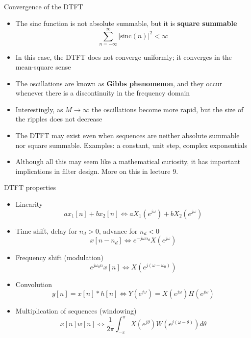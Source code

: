 \documentclass[10pt]{beamer}
\begin{document}
%
\begin{frame}{Convergence of the DTFT}
\begin{itemize}
	\item The sinc function is not absolute summable, but it is \textbf{square summable}
	\begin{equation*}
		\sum_{n=-\infty}^{\infty} |\mathrm{sinc}(n)|^2 < \infty
	\end{equation*}
	\item In this case, the DTFT does not converge uniformly; it converges in the mean-square sense
	\item The oscillations are known as \textbf{Gibbs phenomenon}, and they occur whenever there is a discontinuity in the frequency domain
	\item Interestingly, as $M\to\infty$ the oscillations become more rapid, but the size of the ripples does not decrease
	\item The DTFT may exist even when sequences are neither absolute summable nor square summable. Examples: a constant, unit step, complex exponentials
	\item Although all this may seem like a mathematical curiosity, it has important implications in filter design. More on this in lecture 9.
\end{itemize}
	
\end{frame}

%
\begin{frame}{DTFT properties}
\begin{itemize}
\item Linearity
	\begin{equation*}
	ax_1[n]  + bx_2[n] \Longleftrightarrow aX_1(e^{j\omega})+bX_2(e^{j\omega})
	\end{equation*}
\item Time shift, delay for $n_d > 0$, advance for $n_d < 0$
	\begin{equation*}
	x[n-n_d] \Longleftrightarrow e^{-j\omega n_d}X(e^{j\omega})
	\end{equation*}
\item Frequency shift (modulation)
	\begin{equation*}
	e^{j\omega_0n}x[n] \Longleftrightarrow X(e^{j(\omega-\omega_0)})
	\end{equation*}
\item Convolution
	\begin{equation*}
	y[n] = x[n]\ast h[n] \Longleftrightarrow Y(e^{j\omega}) = X(e^{j\omega})H(e^{j\omega})
	\end{equation*}
\item Multiplication of sequences (windowing)
	\begin{equation*}
	x[n]w[n] \Longleftrightarrow \frac{1}{2\pi}\int_{-\pi}^{\pi}X(e^{j\theta})W(e^{j(\omega-\theta)}){d\theta}
	\end{equation*}
\end{itemize}
\end{frame}
\end{document}
